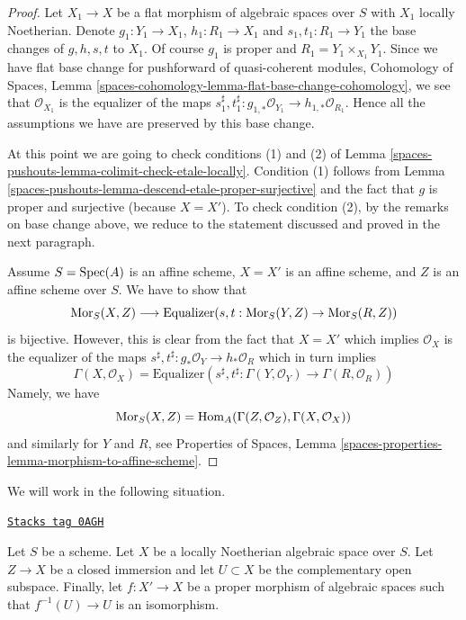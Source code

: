 \begin{proof}
\medskip\noindent
Let $X_1 \to X$ be a flat morphism of algebraic spaces over $S$ with $X_1$
locally Noetherian. Denote $g_1 : Y_1 \to X_1$, $h_1 : R_1 \to X_1$ and
$s_1, t_1 : R_1 \to Y_1$ the base changes of $g, h, s, t$ to $X_1$.
Of course $g_1$ is proper and $R_1 = Y_1 \times_{X_1} Y_1$.
Since we have flat base change for pushforward of quasi-coherent modules,
Cohomology of Spaces, Lemma
\ref{spaces-cohomology-lemma-flat-base-change-cohomology}, we see that
$\mathcal{O}_{X_1}$ is the equalizer of the maps
$s_1^\sharp, t_1^\sharp : g_{1, *}\mathcal{O}_{Y_1} \to
h_{1, *}\mathcal{O}_{R_1}$. Hence all the assumptions we have
are preserved by this base change.

\medskip\noindent
At this point we are going to check conditions (1) and (2) of
Lemma \ref{spaces-pushouts-lemma-colimit-check-etale-locally}. Condition (1)
follows from Lemma \ref{spaces-pushouts-lemma-descend-etale-proper-surjective}
and the fact that $g$ is proper and surjective (because $X = X'$).
To check condition (2), by the remarks on base change above,
we reduce to the statement discussed and proved in the next paragraph.

\medskip\noindent
Assume $S = \operatorname{Spec}(A)$ is an affine scheme, $X = X'$ is an affine scheme, and
$Z$ is an affine scheme over $S$. We have to show that
$$
\operatorname{Mor}_S(X, Z) \longrightarrow
\text{Equalizer}(s, t : \operatorname{Mor}_S(Y, Z) \to \operatorname{Mor}_S(R, Z))
$$
is bijective. However, this is clear from the fact that $X = X'$
which implies $\mathcal{O}_X$ is the equalizer of the maps
$s^\sharp, t^\sharp : g_*\mathcal{O}_Y \to h_*\mathcal{O}_R$
which in turn implies
$$
\Gamma(X, \mathcal{O}_X) =
\text{Equalizer}\left(
s^\sharp, t^\sharp : \Gamma(Y, \mathcal{O}_Y) \to
\Gamma(R, \mathcal{O}_R)
\right)
$$
Namely, we have
$$
\operatorname{Mor}_S(X, Z) = \operatorname{Hom}_A(\Gamma(Z, \mathcal{O}_Z), \Gamma(X, \mathcal{O}_X))
$$
and similarly for $Y$ and $R$, see Properties of Spaces, Lemma
\ref{spaces-properties-lemma-morphism-to-affine-scheme}.
\end{proof}

We will work in the following situation.

\begin{definition}
\label{spaces-pushouts-situation-coequalizer-glue}
\href{https://stacks.math.columbia.edu/tag/0AGH}{\texttt{Stacks tag 0AGH}}

Let $S$ be a scheme. Let $X$ be a locally Noetherian algebraic space over $S$.
Let $Z \to X$ be a closed immersion and let $U \subset X$ be the complementary
open subspace. Finally, let $f : X' \to X$ be a proper morphism of algebraic
spaces such that $f^{-1}(U) \to U$ is an isomorphism.
\end{definition}

